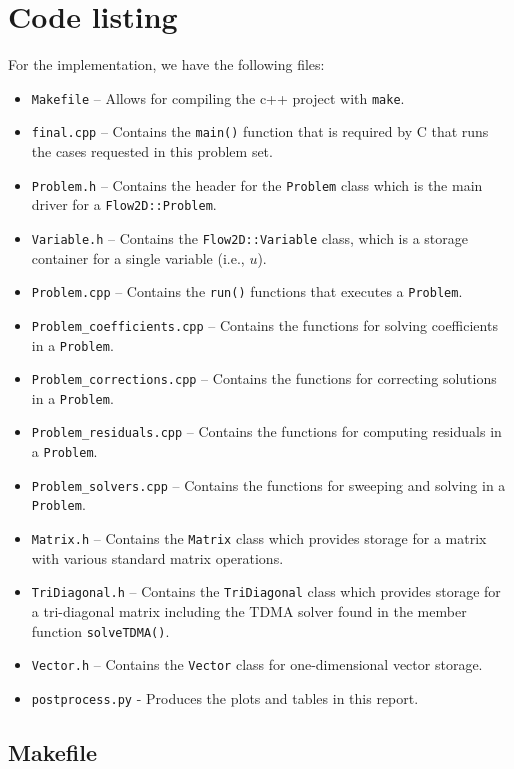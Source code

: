 \documentclass{article}
\begin{document}
\section*{Code listing}

For the implementation, we have the following files:
\begin{itemize}
	\item \texttt{Makefile} -- Allows for compiling the c++ project with \texttt{make}.
	\item \texttt{final.cpp} -- Contains the \texttt{main()} function that is required by C that runs the cases requested in this problem set.
	\item \texttt{Problem.h} -- Contains the header for the \texttt{Problem} class which is the main driver for a \texttt{Flow2D::Problem}.
	\item \texttt{Variable.h} -- Contains the \texttt{Flow2D::Variable} class, which is a storage container for a single variable (i.e., $u$).
	\item \texttt{Problem.cpp} -- Contains the \texttt{run()} functions that executes a \texttt{Problem}.
	\item \texttt{Problem\_coefficients.cpp} -- Contains the functions for solving coefficients in a \texttt{Problem}.
	\item \texttt{Problem\_corrections.cpp} -- Contains the functions for correcting solutions in a \texttt{Problem}.
	\item \texttt{Problem\_residuals.cpp} -- Contains the functions for computing residuals in a \texttt{Problem}.
	\item \texttt{Problem\_solvers.cpp} -- Contains the functions for sweeping and solving in a \texttt{Problem}.
	\item \texttt{Matrix.h} -- Contains the \texttt{Matrix} class which provides storage for a matrix with various standard matrix operations.
	\item \texttt{TriDiagonal.h} -- Contains the \texttt{TriDiagonal} class which provides storage for a tri-diagonal matrix including the TDMA solver found in the member function \texttt{solveTDMA()}.
	\item \texttt{Vector.h} -- Contains the \texttt{Vector} class for one-dimensional vector storage.
	\item \texttt{postprocess.py} - Produces the plots and tables in this report.
\end{itemize}

\subsection*{Makefile}
\inputminted[fontsize=\scriptsize]{Makefile}{../Makefile}
\end{document}
